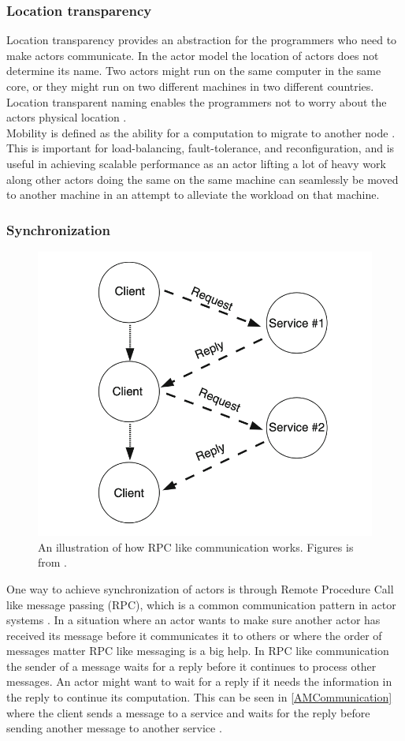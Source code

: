\subsubsection{Location transparency}
Location transparency provides an abstraction for the programmers who need to make actors communicate. In the actor model the location of actors does not determine its name. Two actors might run on the same computer in the same core, or they might run on two different machines in two different countries. Location transparent naming enables the programmers not to worry about the actors physical location \cite{ActorModelPaper}.\\
Mobility is defined as the ability for a computation to migrate to another node \cite{ActorModelPaper}. This is important for load-balancing, fault-tolerance, and reconfiguration, and is useful in achieving scalable performance \cite{ActorModelPaper} as an actor lifting a lot of heavy work along other actors doing the same on the same machine can seamlessly be moved to another machine in an attempt to alleviate the workload on that machine.

\subsubsection{Synchronization} \label{Synchronization}
\begin{figure}[H]
	\centering
	\includegraphics[width=0.6\linewidth]{Materials/ActorModel/AMCommunication}
	\caption{An illustration of how RPC like communication works. Figures is from \cite{ActorModelPaper}.}
	\label{AMCommunication}
\end{figure}
One way to achieve synchronization of actors is through Remote Procedure Call like message passing (RPC), which is a common communication pattern in actor systems \cite{ActorModelPaper}. In a situation where an actor wants to make sure another actor has received its message before it communicates it to others or where the order of messages matter RPC like messaging is a big help. In RPC like communication the sender of a message waits for a reply before it continues to process other messages. An actor might want to wait for a reply if it needs the information in the reply to continue its computation. This can be seen in \autoref{AMCommunication} where the client sends a message to a service and waits for the reply before sending another message to another service \cite{ActorModelPaper}.\\
